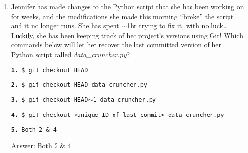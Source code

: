 \documentclass[12pt]{article}
\begin{document}
\begin{enumerate}
\item Jennifer has made changes to the Python script that she has been working on for weeks, and the modifications she made this morning “broke” the script and it no longer runs. She has spent $\sim$1hr trying to fix it, with no luck…
Luckily, she has been keeping track of her project’s versions using Git! Which commands below will let her recover the last committed version of her Python script called \emph{data\_cruncher.py}?
\begin{flushleft}
\texttt{\textbf{1.} \$ git checkout HEAD}
\end{flushleft}
\begin{flushleft}
\texttt{\textbf{2.} \$ git checkout HEAD data\_cruncher.py}
\end{flushleft}
\begin{flushleft}
\texttt{\textbf{3.} \$ git checkout HEAD$\sim$1 data\_cruncher.py}
\end{flushleft}
\begin{flushleft}
\texttt{\textbf{4.} \$ git checkout <unique ID of last commit> data\_cruncher.py}
\end{flushleft}
\begin{flushleft}
\texttt{\textbf{5.} Both 2 \& 4}
\end{flushleft}
\begin{center}
\textsf{\underline{Answer:} Both 2 \& 4}
\end{center}
\end{enumerate}
\end{document}

